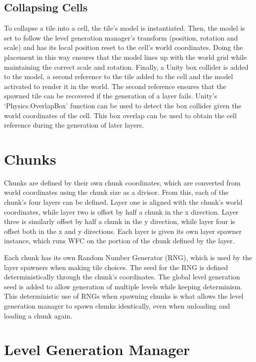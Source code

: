 \subsection{Collapsing Cells}\label{sec:collapsingCells}
To collapse a tile into a cell, the tile's model is instantiated. Then, the model is set to follow the level generation manager's transform (position, rotation and scale) and has its local position reset to the cell's world coordinates. Doing the placement in this way ensures that the model lines up with the world grid while maintaining the correct scale and rotation. Finally, a Unity box collider is added to the model, a second reference to the tile added to the cell and the model activated to render it in the world. The second reference ensures that the spawned tile can be recovered if the generation of a layer fails. Unity's `Physics.OverlapBox' function can be used to detect the box collider given the world coordinates of the cell. This box overlap can be used to obtain the cell reference during the generation of later layers.


\section{Chunks}
Chunks are defined by their own chunk coordinates, which are converted from world coordinates using the chunk size as a divisor. From this, each of the chunk's four layers can be defined. Layer one is aligned with the chunk's world coordinates, while layer two is offset by half a chunk in the x direction. Layer three is similarly offset by half a chunk in the y direction, while layer four is offset both in the x and y directions. Each layer is given its own layer spawner instance, which runs WFC on the portion of the chunk defined by the layer.


Each chunk has its own Random Number Generator (RNG), which is used by the layer spawners when making tile choices. The seed for the RNG is defined deterministically through the chunk's coordinates. The global level generation seed is added to allow generation of multiple levels while keeping determinism. This deterministic use of RNGs when spawning chunks is what allows the level generation manager to spawn chunks identically, even when unloading and loading a chunk again.

\section{Level Generation Manager}
